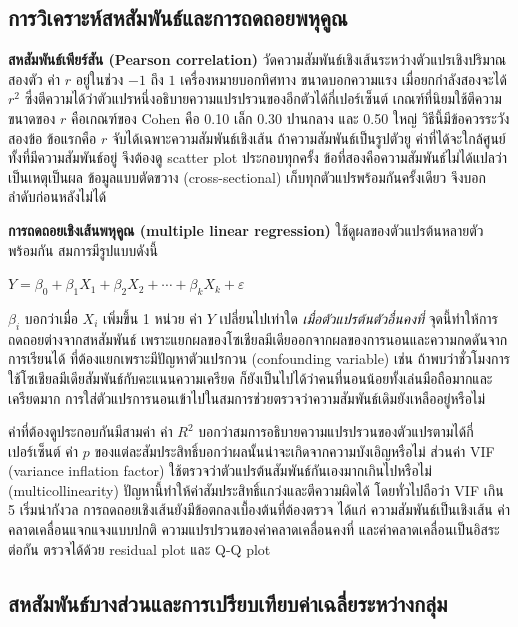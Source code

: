 \subsection{การวิเคราะห์สหสัมพันธ์และการถดถอยพหุคูณ}

\textbf{สหสัมพันธ์เพียร์สัน (Pearson correlation)} วัดความสัมพันธ์เชิงเส้นระหว่างตัวแปรเชิงปริมาณสองตัว
ค่า $r$ อยู่ในช่วง $-1$ ถึง $1$ เครื่องหมายบอกทิศทาง ขนาดบอกความแรง
เมื่อยกกำลังสองจะได้ $r^2$ ซึ่งตีความได้ว่าตัวแปรหนึ่งอธิบายความแปรปรวนของอีกตัวได้กี่เปอร์เซ็นต์
เกณฑ์ที่นิยมใช้ตีความขนาดของ $r$ คือเกณฑ์ของ Cohen \cite{cohen1988statistical}
คือ 0.10 เล็ก 0.30 ปานกลาง และ 0.50 ใหญ่
วิธีนี้มีข้อควรระวังสองข้อ ข้อแรกคือ $r$ จับได้เฉพาะความสัมพันธ์เชิงเส้น
ถ้าความสัมพันธ์เป็นรูปตัวยู ค่าที่ได้จะใกล้ศูนย์ทั้งที่มีความสัมพันธ์อยู่ จึงต้องดู scatter plot ประกอบทุกครั้ง
ข้อที่สองคือความสัมพันธ์ไม่ได้แปลว่าเป็นเหตุเป็นผล
ข้อมูลแบบตัดขวาง (cross-sectional) เก็บทุกตัวแปรพร้อมกันครั้งเดียว จึงบอกลำดับก่อนหลังไม่ได้

\textbf{การถดถอยเชิงเส้นพหุคูณ (multiple linear regression)} ใช้ดูผลของตัวแปรต้นหลายตัวพร้อมกัน
สมการมีรูปแบบดังนี้

\begin{center}
$Y = \beta_0 + \beta_1 X_1 + \beta_2 X_2 + \cdots + \beta_k X_k + \varepsilon$
\end{center}

\noindent
$\beta_i$ บอกว่าเมื่อ $X_i$ เพิ่มขึ้น 1 หน่วย ค่า $Y$ เปลี่ยนไปเท่าใด
\textit{เมื่อตัวแปรต้นตัวอื่นคงที่} จุดนี้ทำให้การถดถอยต่างจากสหสัมพันธ์
เพราะแยกผลของโซเชียลมีเดียออกจากผลของการนอนและความกดดันจากการเรียนได้
ที่ต้องแยกเพราะมีปัญหาตัวแปรกวน (confounding variable)
เช่น ถ้าพบว่าชั่วโมงการใช้โซเชียลมีเดียสัมพันธ์กับคะแนนความเครียด
ก็ยังเป็นไปได้ว่าคนที่นอนน้อยทั้งเล่นมือถือมากและเครียดมาก
การใส่ตัวแปรการนอนเข้าไปในสมการช่วยตรวจว่าความสัมพันธ์เดิมยังเหลืออยู่หรือไม่

ค่าที่ต้องดูประกอบกันมีสามค่า ค่า $R^2$ บอกว่าสมการอธิบายความแปรปรวนของตัวแปรตามได้กี่เปอร์เซ็นต์
ค่า $p$ ของแต่ละสัมประสิทธิ์บอกว่าผลนั้นน่าจะเกิดจากความบังเอิญหรือไม่
ส่วนค่า VIF (variance inflation factor) ใช้ตรวจว่าตัวแปรต้นสัมพันธ์กันเองมากเกินไปหรือไม่ (multicollinearity)
ปัญหานี้ทำให้ค่าสัมประสิทธิ์แกว่งและตีความผิดได้ โดยทั่วไปถือว่า VIF เกิน 5 เริ่มน่ากังวล
การถดถอยเชิงเส้นยังมีข้อตกลงเบื้องต้นที่ต้องตรวจ ได้แก่ ความสัมพันธ์เป็นเชิงเส้น
ค่าคลาดเคลื่อนแจกแจงแบบปกติ ความแปรปรวนของค่าคลาดเคลื่อนคงที่ และค่าคลาดเคลื่อนเป็นอิสระต่อกัน
ตรวจได้ด้วย residual plot และ Q-Q plot

\subsection{สหสัมพันธ์บางส่วนและการเปรียบเทียบค่าเฉลี่ยระหว่างกลุ่ม}

